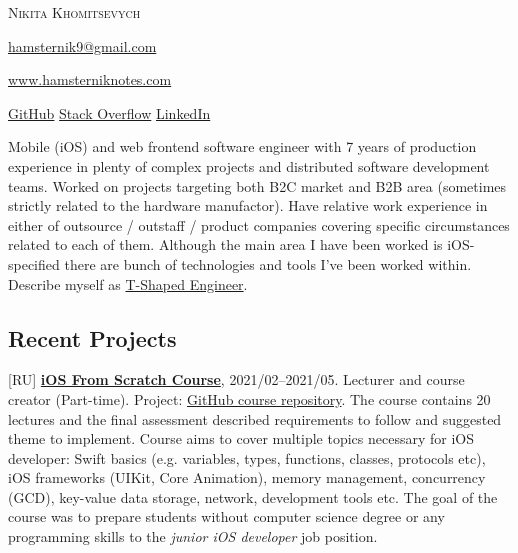 \documentclass{nk-resume}
\begin{document}


\textsc{\huge{Nikita Khomitsevych}}

\vspace*{14px}

\href{mailto:hamsternik9@gmail.com}{hamsternik9@gmail.com} 

\href{https://hamsterniknotes.com}{www.hamsterniknotes.com}

\href{http://github.com/hamsternik}{\normalsize{GitHub}}
\hspace{2px}
\href{https://stackoverflow.com/users/3527499/hamsternik}{\normalsize{Stack Overflow}}
\hspace{2px}
\href{https://www.linkedin.com/in/khomitsevych/}{\normalsize{LinkedIn}} 

\vspace*{14px}

Mobile (iOS) and web frontend software engineer with 7 years of production experience in plenty of complex projects 
and distributed software development teams. Worked on projects targeting both B2C market and B2B area 
(sometimes strictly related to the hardware manufactor). Have relative work experience in either of 
outsource / outstaff / product companies covering specific circumstances related to each of them. 
Although the main area I have been worked is iOS-specified there are bunch of technologies and tools I've been worked within.
Describe myself as \href{https://alexkondov.com/the-t-shaped-engineer/}{T-Shaped Engineer}.


\subsection*{Recent Projects}

[RU] \textbf{\href{https://robotdreams.cc/course/ios-razrabotka-prilozheniy-s-0}{iOS From Scratch Course}}, 2021/02--2021/05.
\newline Lecturer and course creator (Part-time). Project: \href{https://github.com/hamsternik/robotdreams-ios-course}{GitHub course repository}.
\newline The course contains 20 lectures and the final assessment described requirements to follow and suggested theme to implement.
Course aims to cover multiple topics necessary for iOS developer:
Swift basics (e.g. variables, types, functions, classes, protocols etc), iOS frameworks (UIKit, Core Animation), 
memory management, concurrency (GCD), key-value data storage, network, development tools etc.
\newline The goal of the course was to prepare students without computer science degree or any programming skills to the \textit{junior iOS developer} job position.
\end{document}

